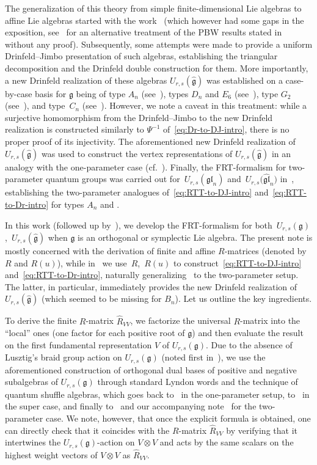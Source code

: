\documentclass[pdftex]{sigma}
\numberwithin{equation}{section}
\newcommand{\fg}{\mathfrak{g}}
\newcommand{\gl}{\mathfrak{gl}}
\newcommand{\uu}{U_{r,s}(\fg)}
\newcommand{\UU}{U_{r,s}(\widehat{\fg})}
\begin{document}
The generalization of this theory from simple finite-dimensional Lie algebras to affine Lie algebras started with the work~\cite{HRZ} (which however had some gaps in the exposition, see~\cite{Ts} for an alternative treatment of the PBW results stated in~\cite{HRZ} without any proof). Subsequently, some attempts were made to provide a uniform Drinfeld--Jimbo presentation of such algebras, establishing the triangular decomposition and the Drinfeld double construction for them. More importantly, a new Drinfeld realization of these algebras $\UU$ was established on a case-by-case basis for $\fg$ being of type $A_n$ (see~\cite{HRZ}), types $D_n$ and $E_6$ (see~\cite{HZ2}), type $G_2$ (see~\cite{GHZ}), and type~$C_n$ (see~\cite{HZ1}). However, we note a caveat in this treatment: while a surjective homomorphism from the Drinfeld--Jimbo to the new Drinfeld realization is constructed similarly to $\Psi^{-1}$ of~\eqref{eq:Dr-to-DJ-intro}, there is no proper proof of its injectivity. The aforementioned new Drinfeld realization of $\UU$ was used to construct the vertex representations of $\UU$ in an analogy with the one-parameter case (cf.\ \cite{FJ}). Finally, the FRT-formalism for two-parameter quantum groups was carried out for~$U_{r,s}(\gl_n)$ and~$U_{r,s}\bigl(\widehat{\gl}_n\bigr)$ in~\cite{JL1,JL2}, establishing the two-parameter analogues of~\eqref{eq:RTT-to-DJ-intro} and~\eqref{eq:RTT-to-Dr-intro} for types $A_n$ and .

In this work (followed up by~\cite{MT2}), we develop the FRT-formalism for both~$\uu$,~$\UU$ when $\fg$ is an orthogonal or symplectic Lie algebra. The present note is mostly concerned with the derivation of finite and affine $R$-matrices (denoted by $R$ and $R(u)$), while in~\cite{MT2} we use~$R$,~$R(u)$ to construct~\eqref{eq:RTT-to-DJ-intro} and~\eqref{eq:RTT-to-Dr-intro}, naturally generalizing~\cite{JLM2, JLM1} to the two-parameter setup. The latter, in particular, immediately provides the new Drinfeld realization of $\UU$ (which seemed to be missing for $B_n$). Let us outline the key ingredients.

To derive the finite $R$-matrix $\hat{R}_{VV}$, we factorize the universal $R$-matrix into the ``local'' ones (one factor for each positive root of $\fg$) and then evaluate the result on the first fundamental representation $V$ of $\uu$. Due to the absence of Lusztig's braid group action on $\uu$ (noted first in~\cite{BGH1}), we use the aforementioned construction of orthogonal dual bases of positive and negative subalgebras of $\uu$ through standard Lyndon words and the technique of quantum shuffle algebras, which goes back to~\cite{K1,K2,L,Ro} in the one-parameter setup, to~\cite{CHW} in the super case, and finally to~\cite{BH,BKL,HW1,HW2} and our accompanying note~\cite{MT1} for the two-parameter case. We note, however, that once the explicit formula is obtained, one can directly check that it coincides with the $R$-matrix $\hat{R}_{VV}$ by verifying that it intertwines the $\uu$-action on $V\otimes V$ and acts by the same scalars on the highest weight vectors of $V\otimes V$ as $\hat{R}_{VV}$.
\end{document}
